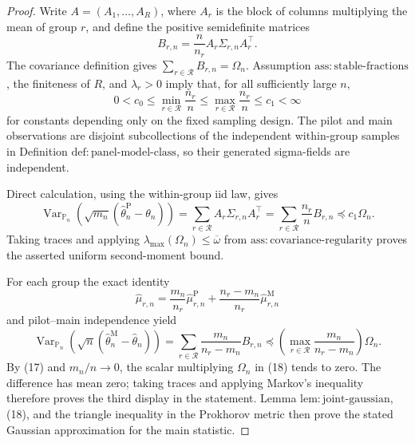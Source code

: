 \documentclass{article}
\begin{document}
\begin{proof}
Write \(A=(A_1,\ldots,A_R)\), where \(A_r\) is the block of columns multiplying the mean of group \(r\), and define the positive semidefinite matrices
\[
 B_{r,n}=\frac n{n_r}A_r\Sigma_{r,n}A_r^{\top}.
\]
The covariance definition gives \(\sum_{r\in\mathcal R}B_{r,n}=\Omega_n\).  Assumption \(\mathrm{ass:stable\text{-}fractions}\), the finiteness of \(R\), and \(\lambda_r>0\) imply that, for all sufficiently large \(n\),
\[
 0<c_0\le \min_{r\in\mathcal R}\frac{n_r}{n}
 \le \max_{r\in\mathcal R}\frac{n_r}{n}\le c_1<\infty
\tag{17}
\]
for constants depending only on the fixed sampling design.  The pilot and main observations are disjoint subcollections of the independent within-group samples in Definition \(\mathrm{def:panel\text{-}model\text{-}class}\), so their generated sigma-fields are independent.

Direct calculation, using the within-group iid law, gives
\[
 \operatorname{Var}_{\mathbb P_n}\!\left(
 \sqrt{m_n}(\widehat\theta_n^{\mathrm P}-\theta_n)
 \right)
 =\sum_{r\in\mathcal R}A_r\Sigma_{r,n}A_r^{\top}
 =\sum_{r\in\mathcal R}\frac{n_r}{n}B_{r,n}
 \preceq c_1\Omega_n.
\]
Taking traces and applying \(\lambda_{\max}(\Omega_n)\le\overline\omega\) from \(\mathrm{ass:covariance\text{-}regularity}\) proves the asserted uniform second-moment bound.

For each group the exact identity
\[
 \widehat\mu_{r,n}
 =\frac{m_n}{n_r}\widehat\mu_{r,n}^{\mathrm P}
  +\frac{n_r-m_n}{n_r}\widehat\mu_{r,n}^{\mathrm M}
\]
and pilot--main independence yield
\[
 \operatorname{Var}_{\mathbb P_n}\!\left(
 \sqrt n(\widehat\theta_n^{\mathrm M}-\widehat\theta_n)
 \right)
 =\sum_{r\in\mathcal R}
   \frac{m_n}{n_r-m_n}B_{r,n}
 \preceq
 \left(\max_{r\in\mathcal R}\frac{m_n}{n_r-m_n}\right)\Omega_n.
\tag{18}
\]
By (17) and \(m_n/n\to0\), the scalar multiplying \(\Omega_n\) in (18) tends to zero.  The difference has mean zero; taking traces and applying Markov's inequality therefore proves the third display in the statement.  Lemma \(\mathrm{lem:joint\text{-}gaussian}\), (18), and the triangle inequality in the Prokhorov metric then prove the stated Gaussian approximation for the main statistic.


\end{proof}
\end{document}

